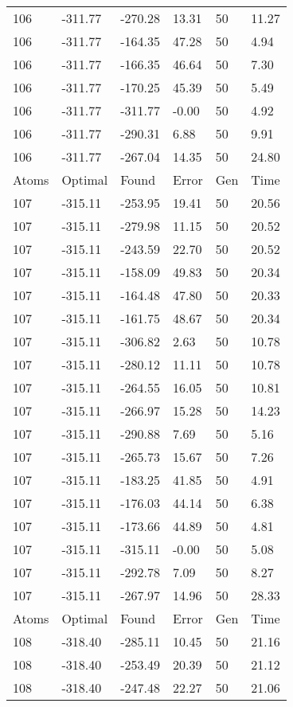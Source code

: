 \documentclass{report}
\begin{document}
\begin{appendix}
\begin{longtable}{llllll}
106 & -311.77 & -270.28 & 13.31 & 50 & 11.27 \\
106 & -311.77 & -164.35 & 47.28 & 50 & 4.94 \\
106 & -311.77 & -166.35 & 46.64 & 50 & 7.30 \\
106 & -311.77 & -170.25 & 45.39 & 50 & 5.49 \\
106 & -311.77 & -311.77 & -0.00 & 50 & 4.92 \\
106 & -311.77 & -290.31 & 6.88 & 50 & 9.91 \\
106 & -311.77 & -267.04 & 14.35 & 50 & 24.80 \\
Atoms & Optimal & Found & Error & Gen & Time \\
107 & -315.11 & -253.95 & 19.41 & 50 & 20.56 \\
107 & -315.11 & -279.98 & 11.15 & 50 & 20.52 \\
107 & -315.11 & -243.59 & 22.70 & 50 & 20.52 \\
107 & -315.11 & -158.09 & 49.83 & 50 & 20.34 \\
107 & -315.11 & -164.48 & 47.80 & 50 & 20.33 \\
107 & -315.11 & -161.75 & 48.67 & 50 & 20.34 \\
107 & -315.11 & -306.82 & 2.63 & 50 & 10.78 \\
107 & -315.11 & -280.12 & 11.11 & 50 & 10.78 \\
107 & -315.11 & -264.55 & 16.05 & 50 & 10.81 \\
107 & -315.11 & -266.97 & 15.28 & 50 & 14.23 \\
107 & -315.11 & -290.88 & 7.69 & 50 & 5.16 \\
107 & -315.11 & -265.73 & 15.67 & 50 & 7.26 \\
107 & -315.11 & -183.25 & 41.85 & 50 & 4.91 \\
107 & -315.11 & -176.03 & 44.14 & 50 & 6.38 \\
107 & -315.11 & -173.66 & 44.89 & 50 & 4.81 \\
107 & -315.11 & -315.11 & -0.00 & 50 & 5.08 \\
107 & -315.11 & -292.78 & 7.09 & 50 & 8.27 \\
107 & -315.11 & -267.97 & 14.96 & 50 & 28.33 \\
Atoms & Optimal & Found & Error & Gen & Time \\
108 & -318.40 & -285.11 & 10.45 & 50 & 21.16 \\
108 & -318.40 & -253.49 & 20.39 & 50 & 21.12 \\
108 & -318.40 & -247.48 & 22.27 & 50 & 21.06 \\

\end{longtable}
\end{appendix}
\end{document}
